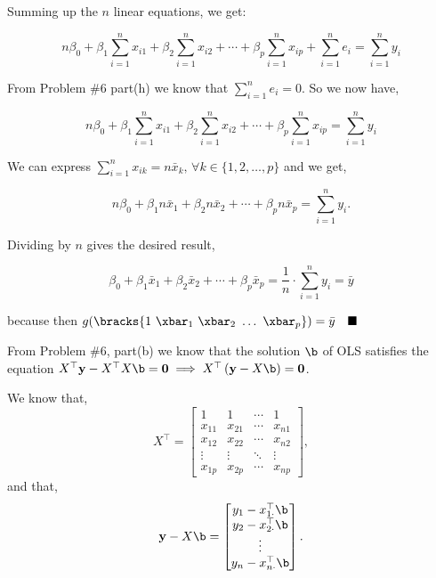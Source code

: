 \documentclass[12pt]{article}
\begin{document}
\begin{enumerate}
\begin{tcolorbox}[colback=white, sharp corners]
Summing up the $n$ linear equations, we get: 

\[
	n\beta_0 + \beta_1 \sum_{i=1}^n x_{i1} + \beta_2 \sum_{i=1}^n x_{i2} + \cdots + \beta_p \sum_{i=1}^n x_{ip} + \sum_{i=1}^n e_i = \sum_{i=1}^n y_i
\]

From Problem \#6 part(h) we know that $ \displaystyle \sum_{i=1}^n e_i = 0$. So we now have, 

\[
	n\beta_0 + \beta_1 \sum_{i=1}^n x_{i1} + \beta_2 \sum_{i=1}^n x_{i2} + \cdots + \beta_p \sum_{i=1}^n x_{ip}  = \sum_{i=1}^n y_i
\]

We can express $ \displaystyle \sum_{i=1}^n x_{ik} = n \bar{x}_k, \, \forall k \in \lbrace 1, 2, \ldots, p \rbrace$ and we get, 

\[
	n\beta_0 + \beta_1 n \bar{x}_1  + \beta_2 n \bar{x}_2 + \cdots + \beta_p n \bar{x}_p  = \sum_{i=1}^n y_i. 
\]

Dividing by $n$ gives the desired result, 

\[
	\beta_0 + \beta_1 \bar{x}_1  + \beta_2 \bar{x}_2 + \cdots + \beta_p \bar{x}_p  = \dfrac{1}{n} \cdot \sum_{i=1}^n y_i = \bar{y}
\]

because then $g(\bracks{1 ~\xbar_1~ \xbar_2~ \ldots~ \xbar_p}) =\bar{y} \quad \blacksquare$

\end{tcolorbox}

\newpage

\begin{tcolorbox}[colback=white, sharp corners]

From Problem \#6, part(b) we know that the solution $\b$ of OLS satisfies the equation $ X^\top \mathbf{y} - X^\top X \b = \mathbf{0} \implies X^\top \left(\mathbf{y} - X \b  \right) = \mathbf{0}$. 

We know that,  
\[
X^\top = \begin{bmatrix} 1 & 1 & \cdots & 1 \\
x_{11} & x_{21}& \cdots & x_{n1} \\ x_{12} & x_{22} & \cdots & x_{n2} \\ \vdots & \vdots & \ddots & \vdots \\ x_{1p} & x_{2p} & \cdots & x_{np} \end{bmatrix},
\] 
and that, 
\[
	\mathbf{y} - X \b  = \begin{bmatrix} y_1 - x_{1 \cdot}^\top \b \\ y_2 - x_{2 \cdot}^\top \b \\ \vdots \\ y_n - x_{n \cdot}^\top \b \end{bmatrix}.
\]


\end{tcolorbox}
\end{enumerate}
\end{document}
